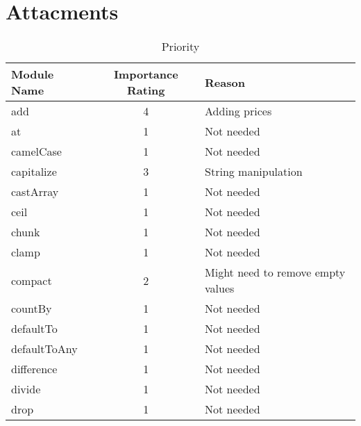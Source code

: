 \documentclass[a4paper, 12pt]{article}
\begin{document}




\section*{Attacments}

\begin{table}[h]\caption{Priority}\label{priorityTable}
    \centering
    \begin{tabular}{l|c|l}
    \textbf{ Module Name}  & \textbf{Importance Rating} & \textbf{Reason}                                \\ \hline
    add          & 4                 & Adding prices                         \\  \hline
    at           & 1                 & Not needed                            \\ \hline
    camelCase    & 1                 & Not needed                            \\ \hline
    capitalize   & 3                 & String manipulation                   \\ \hline
    castArray    & 1                 & Not needed                            \\ \hline
    ceil         & 1                 & Not needed                            \\ \hline
    chunk        & 1                 & Not needed                            \\ \hline
    clamp        & 1                 & Not needed                            \\ \hline
    compact      & 2                 & Might need to remove empty values     \\ \hline
    countBy      & 1                 & Not needed                            \\ \hline
    defaultTo    & 1                 & Not needed                            \\ \hline
    defaultToAny & 1                 & Not needed                            \\ \hline
    difference   & 1                 & Not needed                            \\ \hline
    divide       & 1                 & Not needed                            \\ \hline
    drop         & 1                 & Not needed                            \\ \hline

\end{tabular}
\end{table}
\end{document}
